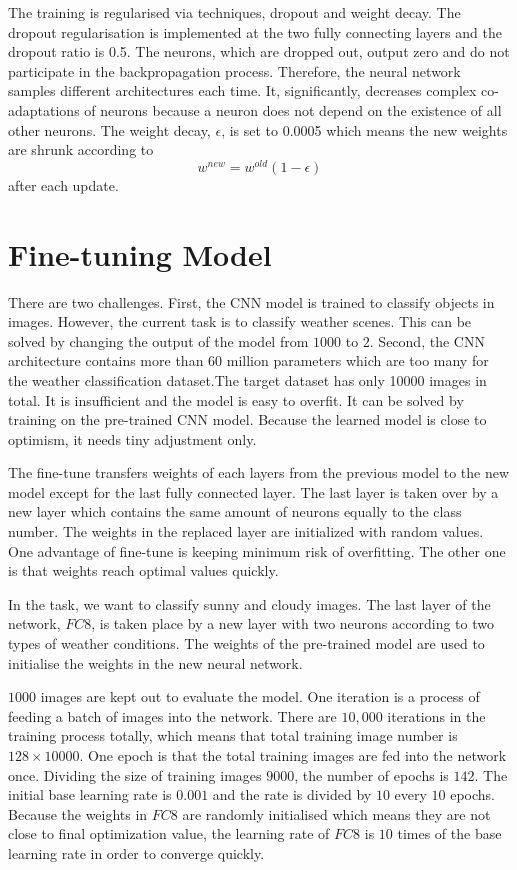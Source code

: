 The training is regularised via techniques, dropout and weight decay. The dropout regularisation is implemented at the two fully connecting layers and the dropout ratio is 0.5. The neurons, which are dropped out, output zero and do not participate in the backpropagation process. Therefore, the neural network samples different architectures each time. It, significantly, decreases complex co-adaptations of neurons because a neuron does not depend on the existence of all other neurons. The weight decay, $\epsilon$, is set to 0.0005 which means the new weights are shrunk according to 
\begin{equation}\label{eq:WeightDecay}
w^{new} = w^{old}(1 - \epsilon)
\end{equation}
after each update.

\section{Fine-tuning Model}

There are two challenges. First, the CNN model is trained to classify objects in images. However, the current task is to classify weather scenes. This can be solved by changing the output of the model from $1000$ to $2$. Second, the CNN architecture contains more than 60 million parameters which are too many for the weather classification dataset.The target dataset has only 10000 images in total. It is insufficient and the model is easy to overfit. It can be solved by training on the pre-trained CNN model. Because the learned model is close to optimism, it needs tiny adjustment only.

The fine-tune transfers weights of each layers from the previous model to the new model except for the last fully connected layer. The last layer is taken over by a new layer which contains the same amount of neurons equally to the class number. The weights in the replaced layer are initialized with random values. One advantage of fine-tune is keeping minimum risk of overfitting. The other one is that weights reach optimal values quickly.

In the task, we want to classify sunny and cloudy images. The last layer of the network, $FC8$, is taken place by a new layer with two neurons according to two types of weather conditions. The weights of the pre-trained model are used to initialise the weights in the new neural network. 

$1000$ images are kept out to evaluate the model. One iteration is a process of feeding a batch of images into the network. There are $10,000$ iterations in the training process totally, which means that total training image number is $128\times10000$. One epoch is that the total training images are fed into the network once. Dividing the size of training images $9000$, the number of epochs is $142$. The initial base learning rate is $0.001$ and the rate is divided by $10$ every $10$ epochs. Because the weights in $FC8$ are randomly initialised which means they are not close to final optimization value, the learning rate of $FC8$ is $10$ times of the base learning rate in order to converge quickly.

